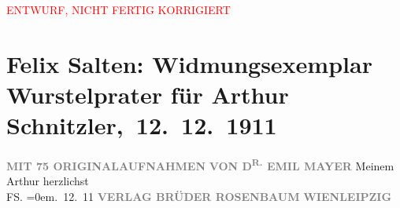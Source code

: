 
\begin{center}
            \textcolor{red}{ENTWURF, NICHT FERTIG KORRIGIERT}
                      \end{center}
            
         
         \renewcommand{\erwaehntePersonen}{Personen: Emil Mayer}
         \renewcommand{\erwaehnteInstitutionen}{Institutionen: Verlagsanstalt Brüder Rosenbaum}
         \renewcommand{\erwaehnteOrte}{Orte: Leipzig, Wien}
         \renewcommand{\erwaehnteWerke}{Werke: Wurstelprater}
               \section[ Felix Salten: Widmungsexemplar Wurstelprater für Arthur Schnitzler, 12. 12. 1911]{ Felix Salten: Widmungsexemplar Wurstelprater für Arthur
               Schnitzler, 12. 12. 1911}\nopagebreak{}\rehead{ }\begin{ledgroupsized}[t]{13cm}\normalsize\beginnumbering \toendnotes[C]{\smallbreak\pagebreak[2]} 
\toendnotes[C]{\smallbreak}\pstart
           \noindent{}\centering{}{\pb}\textcolor{gray}{\textbf{\textbf{}}}\pend
           \pstart
           \noindent{}\centering{}\textcolor{gray}{\textbf{}}\pend
           \pstart
           \noindent{}\centering{}\textcolor{gray}{\textbf{MIT 75 ORIGINALAUFNAHMEN}}\pend
           \pstart
           \noindent{}\centering{}\textcolor{gray}{\textbf{VON D\textsuperscript{R.}{ }EMIL MAYER}}\pend
           \pstart
           \noindent{}Meinem \label{K_L03052-1v}\label{K_L03052-1h} Arthur\pend
           \pstart
           herzlichst{\\[\baselineskip]}\spacefill\mbox{FS.}\pend
           \leftskip=0em{}. 12. 11\pend
           {\bigskip}\pstart
           \noindent{}\centering{}\textcolor{gray}{\textbf{VERLAG BRÜDER ROSENBAUM}}\pend
           \pstart
           \noindent{}\textcolor{gray}{\textbf{WIEN}}\hfill \textcolor{gray}{\textbf{LEIPZIG}}\pend
           
         
         \endnumbering{}\end{ledgroupsized}  \newcommand{\dateiname}{L03052}\newcommand{\titel}{Felix Salten: Widmungsexemplar Wurstelprater für Arthur Schnitzler, 12. 12. 1911}\newcommand{\editorInnen}{Martin Anton Müller und Laura Untner}
      